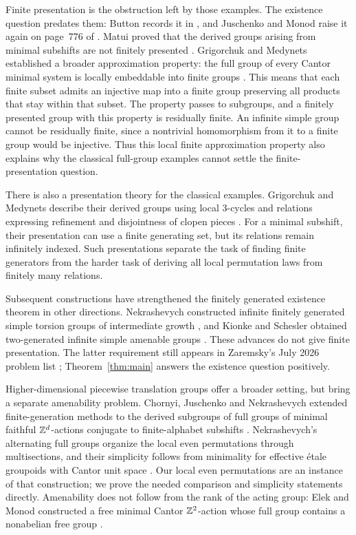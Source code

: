 Finite presentation is the obstruction left by those examples.
The existence question predates them: Button records it in
\cite[p.~729]{Button2010}, and Juschenko and Monod raise it again
on page~776 of \cite{JuschenkoMonod2013}.
Matui proved that the derived groups arising from minimal subshifts
are not finitely presented \cite[Theorem~5.7]{Matui2006}.
Grigorchuk and Medynets established a broader approximation property:
the full group of every Cantor minimal system is locally embeddable
into finite groups \cite[Theorem~2.6]{GrigorchukMedynets2014}.
This means that each finite subset admits an injective map into a
finite group preserving all products that stay within that subset.
The property passes to subgroups, and a finitely presented group
with this property is residually finite.  An infinite simple group
cannot be residually finite, since a nontrivial homomorphism from
it to a finite group would be injective.  Thus this local finite
approximation property also explains why the classical full-group
examples cannot settle the finite-presentation question.

There is also a presentation theory for the classical examples.
Grigorchuk and Medynets describe their derived groups using local
$3$-cycles and relations expressing refinement and disjointness of
clopen pieces \cite{GrigorchukMedynets2018}. For a minimal subshift,
their presentation can use a finite generating set, but its relations
remain infinitely indexed. Such presentations separate the task of
finding finite generators from the harder task of deriving all local
permutation laws from finitely many relations.

Subsequent constructions have strengthened the finitely generated
existence theorem in other directions. Nekrashevych constructed
infinite finitely generated simple torsion groups of intermediate
growth \cite[Theorem~1.2]{Nekrashevych2018}, and Kionke and Schesler
obtained two-generated infinite simple amenable groups
\cite{KionkeSchesler2024}. These advances do not give finite
presentation. The latter requirement still appears in Zaremsky's
July 2026 problem list \cite[Problem~10]{Zaremsky2026};
Theorem~\ref{thm:main} answers the existence question positively.

Higher-dimensional piecewise translation groups offer a broader
setting, but bring a separate amenability problem.  Chornyi,
Juschenko and Nekrashevych extended finite-generation methods to
the derived subgroups of full groups of minimal faithful $\mathbb Z^d$-actions
conjugate to finite-alphabet subshifts
\cite[Theorem~1 in the author version]{ChornyiJuschenkoNekrashevych2020}.
Nekrashevych's alternating full groups organize the local even
permutations through multisections, and their simplicity follows
from minimality for effective {\'e}tale groupoids with Cantor unit space
\cite[Section~3 and Theorem~4.1]{Nekrashevych2019}.
Our local even permutations are an instance of that construction; we
prove the needed comparison and simplicity statements directly.
Amenability does not follow from the rank of the acting group:
Elek and Monod constructed a free minimal Cantor $\mathbb Z^2$-action
whose full group contains a nonabelian free group
\cite[Theorem~1]{ElekMonod2013}.

